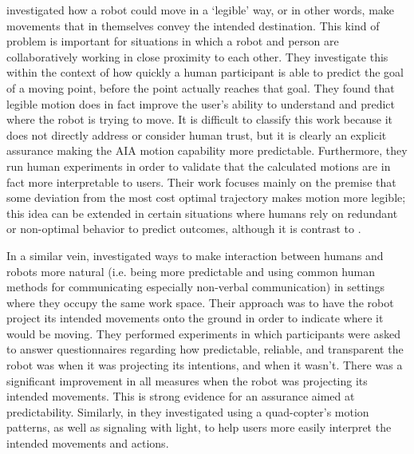 \citet{Dragan2013-wd} investigated how a robot could move in a `legible' way, or in other words, make movements that in themselves convey the intended destination. This kind of problem is important for situations in which a robot and person are collaboratively working in close proximity to each other. They investigate this within the context of how quickly a human participant is able to predict the goal of a moving point, before the point actually reaches that goal. They found that legible motion does in fact improve the user's ability to understand and predict where the robot is trying to move. It is difficult to classify this work because it does not directly address or consider human trust, but it is clearly an explicit assurance making the AIA motion capability more predictable. Furthermore, they run human experiments in order to validate that the calculated motions are in fact more interpretable to users. Their work focuses mainly on the premise that some deviation from the most cost optimal trajectory makes motion more legible; this idea can be extended in certain situations where humans rely on redundant or non-optimal behavior to predict outcomes, although it is contrast to \citet{Wu2016-ei}.

In a similar vein, \citet{Chadalavada2015-wx} investigated ways to make interaction between humans and robots more natural (i.e. being more predictable and using common human methods for communicating especially non-verbal communication) in settings where they occupy the same work space. Their approach was to have the robot project its intended movements onto the ground in order to indicate where it would be moving. They performed experiments in which participants were asked to answer questionnaires regarding how predictable, reliable, and transparent the robot was when it was projecting its intentions, and when it wasn't. There was a significant improvement in all measures when the robot was projecting its intended movements. This is strong evidence for an assurance aimed at predictability. Similarly, in \citet{Szafir2014-ok,Szafir2015-iy} they investigated using a quad-copter's motion patterns, as well as signaling with light, to help users more easily interpret the intended movements and actions.


